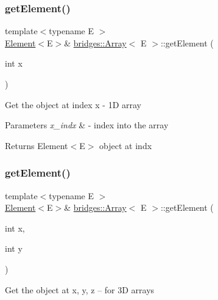 \subsubsection{\texorpdfstring{get\+Element()}{getElement()}\hspace{0.1cm}{\footnotesize\ttfamily [1/3]}}
{\footnotesize\ttfamily template$<$typename E $>$ \\
\mbox{\hyperlink{classbridges_1_1_element}{Element}}$<$E$>$\& \mbox{\hyperlink{classbridges_1_1_array}{bridges\+::\+Array}}$<$ E $>$\+::get\+Element (\begin{DoxyParamCaption}\item[{int}]{x }\end{DoxyParamCaption})\hspace{0.3cm}{\ttfamily [inline]}}

Get the object at index x -\/ 1D array


\begin{DoxyParams}{Parameters}
{\em x\+\_\+indx} & -\/ index into the array\\
\hline
\end{DoxyParams}
\begin{DoxyReturn}{Returns}
Element$<$\+E$>$ object at \textquotesingle{}indx\textquotesingle{} 
\end{DoxyReturn}
\mbox{\label{classbridges_1_1_array_acd5e730e0369b1fa699a5907e889f213}} 
\subsubsection{\texorpdfstring{get\+Element()}{getElement()}\hspace{0.1cm}{\footnotesize\ttfamily [2/3]}}
{\footnotesize\ttfamily template$<$typename E $>$ \\
\mbox{\hyperlink{classbridges_1_1_element}{Element}}$<$E$>$\& \mbox{\hyperlink{classbridges_1_1_array}{bridges\+::\+Array}}$<$ E $>$\+::get\+Element (\begin{DoxyParamCaption}\item[{int}]{x,  }\item[{int}]{y }\end{DoxyParamCaption})\hspace{0.3cm}{\ttfamily [inline]}}

Get the object at x, y, z -- for 3D arrays


